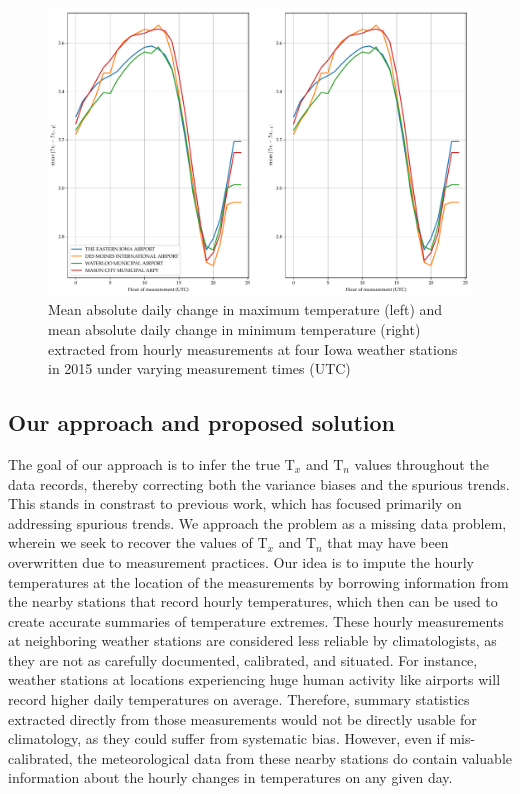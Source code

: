 \documentclass[letter]{article}
\makeatletter
\def\maxwidth{\ifdim\Gin@nat@width>\linewidth\linewidth
\else\Gin@nat@width\fi}
\let\Oldincludegraphics\includegraphics
\renewcommand{\includegraphics}[1]{\Oldincludegraphics[width=0.98\maxwidth]{#1}}
\newcommand{\T}{\mathrm{T}}
\newcommand{\Tn}{\T_{n}}
\newcommand{\Tx}{\T_{x}}
\makeatother
\begin{document}
\begin{figure}
\centering
\includegraphics{../figures/waterloo_meanabsdiff.pdf}
\caption{\label{fig:waterloo_meanabsdiff}
Mean absolute daily change in maximum temperature (left)
and mean absolute daily change in minimum temperature (right)
extracted from hourly measurements at four Iowa weather stations in 2015
under varying measurement times (UTC)}
\end{figure}
    


        \subsection{Our approach and proposed solution}\label{our-approach-and-proposed-solution}
    


        The goal of our approach is to infer the true \(\Tx\) and \(\Tn\) values throughout the data records, thereby correcting both the variance biases and the spurious trends.
This stands in constrast to previous work, which has focused primarily on addressing spurious trends.
We approach the problem as a missing data problem, wherein we seek to recover the values of \(\Tx\) and \(\Tn\) that may have been overwritten due to measurement practices. Our idea is to impute the hourly temperatures
at the location of the measurements by borrowing information from the nearby stations that record hourly temperatures, which then can be used to create accurate summaries of temperature extremes.
These hourly measurements at neighboring weather stations are considered less reliable by climatologists, as they are not as carefully documented, calibrated, and situated. For instance, weather stations at locations experiencing huge human activity like airports will record higher daily temperatures on average.
Therefore, summary statistics extracted directly from those measurements would not be directly usable for climatology, as they could suffer from systematic bias.
However, even if mis-calibrated, the meteorological data from these nearby stations do contain valuable information about the hourly changes in temperatures on any given day.
\end{document}
